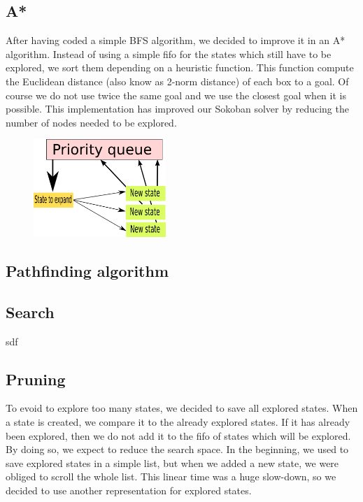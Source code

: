 \documentclass[a4paper,10pt]{article}
\begin{document}
            
	
	\subsection{A*}
	After having coded a simple BFS algorithm, we decided to improve it in an A* algorithm. 
	Instead of using a simple fifo for the states which still have to be explored, we sort them depending on a heuristic function. 
	This function compute the Euclidean distance (also know as 2-norm distance) of each  box to a goal. 
	Of course we do not use twice the same goal and we use the closest goal when it is possible. 
	This implementation has improved our Sokoban solver by reducing the number of nodes needed to be explored.

	\begin{figure}[h]
	\centerline{\includegraphics[height=5 cm, width=5cm]{./priority_state.png}}
	\end{figure}

	\subsection{Pathfinding algorithm}

    \subsection{Search}
        sdf~\cite{solving_soko}
    \subsection{Pruning}
    To evoid to explore too many states, we decided to save all explored states. 
    When a state is created, we compare it to the already explored states. 
    If it has already been explored, then we do not add it to the fifo of states which will be explored. 
    By doing so, we expect to reduce the search space. 
    In the beginning, we used to save explored states in a simple list, but when we added a new state, we were obliged to scroll the whole list. 
    This linear time was a huge slow-down, so we decided to use another representation for explored states.
    
\end{document}
